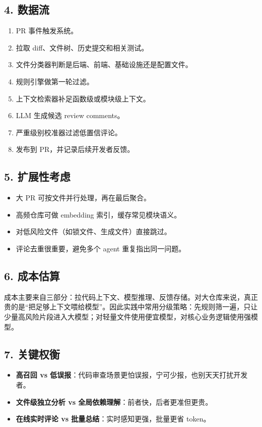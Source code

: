 \subsection{4. 数据流}
\begin{enumerate}[leftmargin=2em]
\item PR 事件触发系统。
\item 拉取 diff、文件树、历史提交和相关测试。
\item 文件分类器判断是后端、前端、基础设施还是配置文件。
\item 规则引擎做第一轮过滤。
\item 上下文检索器补足函数级或模块级上下文。
\item LLM 生成候选 review comments。
\item 严重级别校准器过滤低置信评论。
\item 发布到 PR，并记录后续开发者反馈。
\end{enumerate}

\subsection{5. 扩展性考虑}
\begin{itemize}[leftmargin=2em]
\item 大 PR 可按文件并行处理，再在最后聚合。
\item 高频仓库可做 embedding 索引，缓存常见模块语义。
\item 对低风险文件（如锁文件、生成文件）直接跳过。
\item 评论去重很重要，避免多个 agent 重复指出同一问题。
\end{itemize}

\subsection{6. 成本估算}
成本主要来自三部分：拉代码上下文、模型推理、反馈存储。对大仓库来说，真正贵的是``把足够上下文喂给模型''。因此实践中常用分级策略：先规则筛一遍，只让少量高风险片段进入大模型；对轻量文件使用便宜模型，对核心业务逻辑使用强模型。


\subsection{7. 关键权衡}
\begin{itemize}[leftmargin=2em]
\item \textbf{高召回 vs 低误报}：代码审查场景更怕误报，宁可少报，也别天天打扰开发者。
\item \textbf{文件级独立分析 vs 全局依赖理解}：前者快，后者更准但更贵。
\item \textbf{在线实时评论 vs 批量总结}：实时感知更强，批量更省 token。
\end{itemize}

